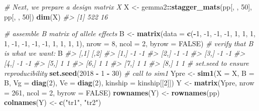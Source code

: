 \documentclass[oneside]{book}\usepackage[]{graphicx}\usepackage[]{color}
\newenvironment{Shaded}{\begin{snugshade}}{\end{snugshade}}
\newcommand{\CommentTok}[1]{\textcolor[rgb]{0.56,0.35,0.01}{\textit{#1}}}
\newcommand{\DataTypeTok}[1]{\textcolor[rgb]{0.13,0.29,0.53}{#1}}
\newcommand{\DecValTok}[1]{\textcolor[rgb]{0.00,0.00,0.81}{#1}}
\newcommand{\KeywordTok}[1]{\textcolor[rgb]{0.13,0.29,0.53}{\textbf{#1}}}
\newcommand{\NormalTok}[1]{#1}
\newcommand{\OperatorTok}[1]{\textcolor[rgb]{0.81,0.36,0.00}{\textbf{#1}}}
\newcommand{\OtherTok}[1]{\textcolor[rgb]{0.56,0.35,0.01}{#1}}
\newcommand{\StringTok}[1]{\textcolor[rgb]{0.31,0.60,0.02}{#1}}
\begin{document}
\begin{Shaded}
\begin{Highlighting}[]
\CommentTok{# Next, we prepare a design matrix X}
\NormalTok{X <-}\StringTok{ }\NormalTok{gemma2}\OperatorTok{::}\KeywordTok{stagger_mats}\NormalTok{(pp[, , }\DecValTok{50}\NormalTok{], pp[, , }\DecValTok{50}\NormalTok{])}
\KeywordTok{dim}\NormalTok{(X)}
\CommentTok{#> [1] 522  16}
\end{Highlighting}
\end{Shaded}

\begin{Shaded}
\begin{Highlighting}[]
\CommentTok{# assemble B matrix of allele effects}
\NormalTok{B <-}\StringTok{ }\KeywordTok{matrix}\NormalTok{(}\DataTypeTok{data =} \KeywordTok{c}\NormalTok{(}\OperatorTok{-}\DecValTok{1}\NormalTok{, }\DecValTok{-1}\NormalTok{, }\DecValTok{-1}\NormalTok{, }\DecValTok{-1}\NormalTok{, }\DecValTok{1}\NormalTok{, }\DecValTok{1}\NormalTok{, }\DecValTok{1}\NormalTok{, }\DecValTok{1}\NormalTok{, }\DecValTok{-1}\NormalTok{, }\DecValTok{-1}\NormalTok{, }\DecValTok{-1}\NormalTok{, }
    \DecValTok{-1}\NormalTok{, }\DecValTok{1}\NormalTok{, }\DecValTok{1}\NormalTok{, }\DecValTok{1}\NormalTok{, }\DecValTok{1}\NormalTok{), }\DataTypeTok{nrow =} \DecValTok{8}\NormalTok{, }\DataTypeTok{ncol =} \DecValTok{2}\NormalTok{, }\DataTypeTok{byrow =} \OtherTok{FALSE}\NormalTok{)}
\CommentTok{# verify that B is what we want:}
\NormalTok{B}
\CommentTok{#>      [,1] [,2]}
\CommentTok{#> [1,]   -1   -1}
\CommentTok{#> [2,]   -1   -1}
\CommentTok{#> [3,]   -1   -1}
\CommentTok{#> [4,]   -1   -1}
\CommentTok{#> [5,]    1    1}
\CommentTok{#> [6,]    1    1}
\CommentTok{#> [7,]    1    1}
\CommentTok{#> [8,]    1    1}
\CommentTok{# set.seed to ensure reproducibility}
\KeywordTok{set.seed}\NormalTok{(}\DecValTok{2018} \OperatorTok{-}\StringTok{ }\DecValTok{1} \OperatorTok{-}\StringTok{ }\DecValTok{30}\NormalTok{)}
\CommentTok{# call to sim1}
\NormalTok{Ypre <-}\StringTok{ }\KeywordTok{sim1}\NormalTok{(}\DataTypeTok{X =}\NormalTok{ X, }\DataTypeTok{B =}\NormalTok{ B, }\DataTypeTok{Vg =} \KeywordTok{diag}\NormalTok{(}\DecValTok{2}\NormalTok{), }\DataTypeTok{Ve =} \KeywordTok{diag}\NormalTok{(}\DecValTok{2}\NormalTok{), }\DataTypeTok{kinship =}\NormalTok{ kinship[[}\DecValTok{2}\NormalTok{]])}
\NormalTok{Y <-}\StringTok{ }\KeywordTok{matrix}\NormalTok{(Ypre, }\DataTypeTok{nrow =} \DecValTok{261}\NormalTok{, }\DataTypeTok{ncol =} \DecValTok{2}\NormalTok{, }\DataTypeTok{byrow =} \OtherTok{FALSE}\NormalTok{)}
\KeywordTok{rownames}\NormalTok{(Y) <-}\StringTok{ }\KeywordTok{rownames}\NormalTok{(pp)}
\KeywordTok{colnames}\NormalTok{(Y) <-}\StringTok{ }\KeywordTok{c}\NormalTok{(}\StringTok{"tr1"}\NormalTok{, }\StringTok{"tr2"}\NormalTok{)}
\end{Highlighting}
\end{Shaded}
\end{document}
